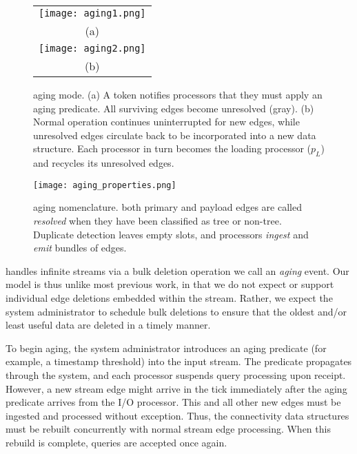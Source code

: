 \begin{figure*}[bht]
\begin{center}
\begin{tabular}{c}
\texttt{[image: aging1.png]} \\
(a) \\
\texttt{[image: aging2.png]} \\
(b) 
\end{tabular}
\end{center}
\caption{\label{fig:xstream-aging} \XSCC aging mode. (a) A token notifies processors
that they must apply an aging predicate.  All surviving edges become unresolved (gray).
(b) Normal operation continues uninterrupted for new edges, while
unresolved edges circulate back to be incorporated into a new data structure. Each processor
in turn becomes the loading processor ($p_L$) and recycles its unresolved edges.}
\end{figure*}

\begin{figure*}[thb]
\begin{center}
\texttt{[image: aging\_properties.png]} \\
\end{center}
\caption{\label{fig:xstream-aging-props} \XSCC aging nomenclature. both
primary
and payload edges are called \emph{resolved} when they have been
classified as tree or non-tree. Duplicate detection leaves empty
slots, and processors \emph{ingest} and \emph{emit} bundles of edges.}
\end{figure*}

\XSCC handles infinite streams via a bulk deletion operation we call
an \emph{aging} event.
Our model is thus unlike most previous work, in that we do not expect or
support individual
edge deletions embedded within the stream.  Rather, we expect the 
system administrator
to schedule bulk deletions to ensure that the oldest and/or 
least useful data are deleted in a timely manner.

To begin aging, the system administrator introduces an aging 
predicate (for example, a timestamp threshold) into the input stream.
The predicate
propagates through the system, and each processor suspends query 
processing upon receipt.  However, a new stream edge might arrive in the 
\XStream tick immediately after the aging predicate arrives from the 
I/O processor.
This and all other new edges must be ingested and processed without exception.  
Thus, the connectivity data structures must be rebuilt concurrently with
normal stream edge processing. When this rebuild is complete, queries
are accepted once again.

